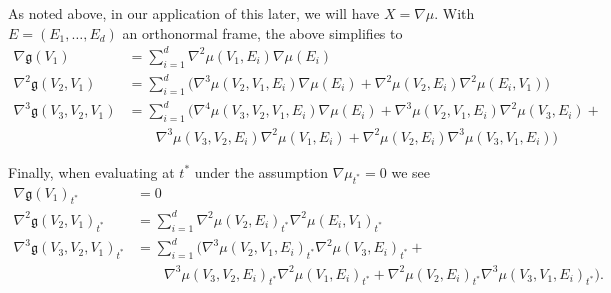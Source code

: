 \documentclass{article}
\begin{document}
As noted above, in our application of this later, we will have $X=\nabla \mu$. With $E=(E_1, \dots, E_d)$ an orthonormal frame, the above simplifies to
$$
\begin{aligned}
\nabla \mathfrak{g}(V_1) &= \sum_{i=1}^d \nabla^2 \mu(V_1, E_i) \nabla \mu(E_i) \\
\nabla^2 \mathfrak{g}(V_2, V_1) &= \sum_{i=1}^d 
\biggl(\nabla^3 \mu(V_2, V_1, E_i) \nabla \mu(E_i) + \nabla^2 \mu(V_2, E_i) \nabla^2 \mu(E_i, V_1) \biggr) \\
  \nabla^3 \mathfrak{g}(V_3, V_2, V_1)& = \sum_{i=1}^d
\biggl(\nabla^4 \mu(V_3, V_2, V_1, E_i) \nabla \mu(E_i) + \nabla^3  \mu(V_2, V_1, E_i) \nabla^2 \mu(V_3, E_i) +  \\
  & \qquad \nabla^3 \mu(V_3, V_2, E_i) \nabla^2 \mu(V_1, E_i) +  \nabla^2 \mu(V_2, E_i) \nabla^3 \mu(V_3, V_1, E_i) \biggr)
\end{aligned}
$$

Finally, when evaluating at $t^*$ under the assumption $\nabla \mu_{t^*}=0$ we see
\begin{equation}
  \label{eq:grad:density}
\begin{aligned}
\nabla \mathfrak{g}(V_1)_{t^*} &= 0 \\
\nabla^2 \mathfrak{g}(V_2, V_1)_{t^*} &= \sum_{i=1}^d 
 \nabla^2 \mu(V_2, E_i)_{t^*} \nabla^2 \mu(E_i, V_1)_{t^*} \\
  \nabla^3 \mathfrak{g}(V_3, V_2, V_1)_{t^*}& = \sum_{i=1}^d
\biggl(\nabla^3  \mu(V_2, V_1, E_i)_{t^*} \nabla^2 \mu(V_3, E_i)_{t^*} +  \\
  & \qquad \nabla^3 \mu(V_3, V_2, E_i)_{t^*} \nabla^2 \mu(V_1, E_i)_{t^*} +  \nabla^2 \mu(V_2, E_i)_{t^*} \nabla^3 \mu(V_3, V_1, E_i)_{t^*} \biggr).
\end{aligned}
\end{equation}
\end{document}
